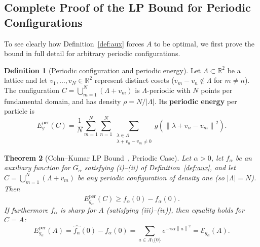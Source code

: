 \documentclass[11pt, a4paper]{article}
\newtheorem{theorem}{Theorem}[section]
\theoremstyle{definition}
\newtheorem{definition}[theorem]{Definition}
\theoremstyle{remark}
\newcommand{\R}{\mathbb{R}}
\newcommand{\Ecal}{\mathcal{E}}
\newcommand{\norm}[1]{\left\lVert #1 \right\rVert}
\newcommand{\abs}[1]{\left\lvert #1 \right\rvert}
\begin{document}
\subsection{Complete Proof of the LP Bound for Periodic Configurations}

To see clearly how Definition~\ref{def:aux} forces $A$ to be optimal, we first prove the bound in full detail for arbitrary periodic configurations.

\begin{definition}[Periodic configuration and periodic energy]
Let $\Lambda \subset \R^2$ be a lattice and let $v_1, \dots, v_N \in \R^2$ represent distinct cosets ($v_m - v_n \notin \Lambda$ for $m \neq n$). The configuration $C = \bigcup_{m=1}^N (\Lambda + v_m)$ is $\Lambda$-periodic with $N$ points per fundamental domain, and has density $\rho = N / \abs{\Lambda}$. Its \textbf{periodic energy} per particle is
\[
E_g^{\text{per}}(C) = \frac{1}{N} \sum_{m=1}^N \sum_{n=1}^N \sum_{\substack{\lambda \in \Lambda \\ \lambda + v_n - v_m \neq 0}} g\left(\norm{\lambda + v_n - v_m}^2\right).
\]
\end{definition}

\begin{theorem}[Cohn--Kumar LP Bound~\cite{CK07}, Periodic Case]
\label{thm:lp_periodic}
Let $\alpha > 0$, let $f_\alpha$ be an auxiliary function for $G_\alpha$ satisfying (i)--(ii) of Definition~\ref{def:aux}, and let $C = \bigcup_{m=1}^N (\Lambda + v_m)$ be any periodic configuration of density one (so $\abs{\Lambda} = N$). Then
\begin{equation}
\label{eq:lp_bound}
E_{g_\alpha}^{\text{per}}(C) \ge \widehat{f_\alpha}(0) - f_\alpha(0).
\end{equation}
If furthermore $f_\alpha$ is sharp for $A$ (satisfying (iii)--(iv)), then equality holds for $C = A$:
\[
E_{g_\alpha}^{\text{per}}(A) = \widehat{f_\alpha}(0) - f_\alpha(0) = \sum_{a \in A \setminus \{0\}} e^{-\pi \alpha \norm{a}^2} = \Ecal_{g_\alpha}(A).
\]
\end{theorem}
\end{document}
